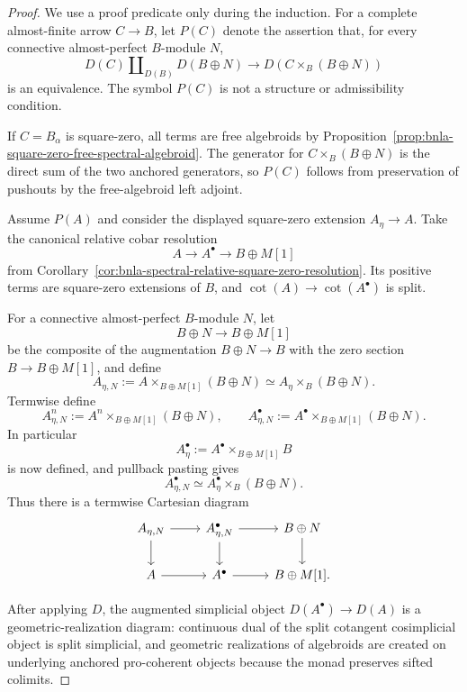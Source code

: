 \begin{proof}
We use a proof predicate only during the induction.  For a complete
almost-finite arrow $C\to B$, let $P(C)$ denote the assertion that, for every
connective almost-perfect $B$-module $N$,
\[
    D(C)\amalg_{D(B)}D(B\oplus N)
    \longrightarrow
    D(C\times_B(B\oplus N))
\]
is an equivalence.  The symbol $P(C)$ is not a structure or admissibility
condition.

If $C=B_\alpha$ is square-zero, all terms are free algebroids by
Proposition~\ref{prop:bnla-square-zero-free-spectral-algebroid}.  The generator
for $C\times_B(B\oplus N)$ is the direct sum of the two anchored generators,
so $P(C)$ follows from preservation of pushouts by the free-algebroid left
adjoint.

Assume $P(A)$ and consider the displayed square-zero extension $A_\eta\to A$.
Take the canonical relative cobar resolution
\[
    A\longrightarrow A^\bullet\longrightarrow B\oplus M[1]
\]
from Corollary~\ref{cor:bnla-spectral-relative-square-zero-resolution}.  Its
positive terms are square-zero extensions of $B$, and
$\operatorname{cot}(A)\to\operatorname{cot}(A^\bullet)$ is split.

For a connective almost-perfect $B$-module $N$, let
\[
    B\oplus N\longrightarrow B\oplus M[1]
\]
be the composite of the augmentation $B\oplus N\to B$ with the zero section
$B\to B\oplus M[1]$, and define
\[
\boxed{
    A_{\eta,N}
    :=
    A\times_{B\oplus M[1]}(B\oplus N)
    \simeq
    A_\eta\times_B(B\oplus N).}
\]
Termwise define
\[
\boxed{
    A_{\eta,N}^n
    :=
    A^n\times_{B\oplus M[1]}(B\oplus N),
    \qquad
    A_{\eta,N}^\bullet
    :=
    A^\bullet\times_{B\oplus M[1]}(B\oplus N).}
\]
In particular
\[
    A_\eta^\bullet
    :=
    A^\bullet\times_{B\oplus M[1]}B
\]
is now defined, and pullback pasting gives
\[
    A_{\eta,N}^\bullet
    \simeq
    A_\eta^\bullet\times_B(B\oplus N).
\]
Thus there is a termwise Cartesian diagram
\[
\begin{tikzcd}
A_{\eta,N} \arrow[r] \arrow[d] &
A_{\eta,N}^\bullet \arrow[r] \arrow[d] &
B\oplus N \arrow[d]\\
A \arrow[r] & A^\bullet \arrow[r] & B\oplus M[1].
\end{tikzcd}
\]

After applying $D$, the augmented simplicial object
$D(A^\bullet)\to D(A)$ is a geometric-realization diagram: continuous dual of
the split cotangent cosimplicial object is split simplicial, and geometric
realizations of algebroids are created on underlying anchored pro-coherent
objects because the monad preserves sifted colimits.


\end{proof}
